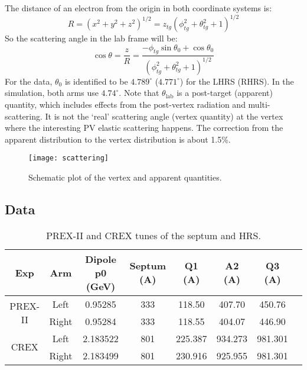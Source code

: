 The distance of an electron from the origin in both coordinate systems is:
\begin{equation}
    R = \left(x^2 + y^2 + z^2\right)^{1/2} = z_{tg} \left(\phi^2_{tg} + \theta^2_{tg} + 1\right)^{1/2}
\end{equation}
So the scattering angle in the lab frame will be:
\begin{equation}
    \cos\theta = \frac{z}{R} = \frac{-\phi_{tg}\sin\theta_0 + \cos\theta_0}{\left(\phi^2_{tg} + \theta^2_{tg} + 1\right)^{1/2}}
\end{equation}
For the data, $\theta_0$ is identified to be $4.789^\circ$ ($4.771^\circ$) for the
LHRS (RHRS). In the simulation, both arms use $4.74^\circ$. Note that $\theta_{\text{lab}}$
is a post-target (apparent) quantity, which includes effects from the 
post-vertex radiation and multi-scattering. It is not the `real' 
scattering angle (vertex quantity) at the vertex 
where the interesting PV elastic scattering happens. The correction from the apparent 
distribution to the vertex distribution is about 1.5\%.
\begin{figure}[!h]
    \centering
    \texttt{[image: scattering]}
    \caption{Schematic plot of the vertex and apparent quantities.}
\end{figure}

\subsection{Data}
\begin{table}[!h]
    \begin{tabular}{c c | c | c | c c c c}
	\hline
	Exp & Arm   & Dipole p0 (GeV)    & Septum (A)  & Q1 (A)	& A2 (A) & Q3 (A)  \\
	\hline
	\multirow{2}{*}{PREX-II} & Left	& 0.95285   & 333   & 118.50	& 407.70    & 450.76    \\
				 & Right& 0.95284   & 333   & 118.55	& 404.07    & 446.90    \\
	\hline
	\multirow{2}{*}{CREX}	& Left	& 2.183522  & 801   & 225.387	& 934.273   & 981.301    \\
				& Right	& 2.183499  & 801   & 230.916	& 925.955   & 981.301    \\
	\hline
    \end{tabular}
    \caption{PREX-II and CREX tunes of the septum and HRS.}
    \label{tab:pcrex_tune}
\end{table}

